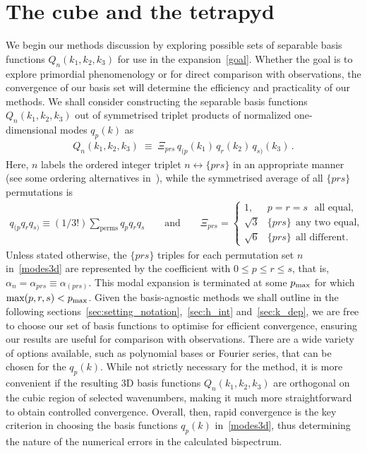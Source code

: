 \section{The cube and the tetrapyd}
We begin our methods discussion by exploring possible sets of separable
basis functions $Q_n(k_1,k_2,k_3)$
for use in the expansion~\eqref{goal}.
Whether the goal is to explore primordial phenomenology or for direct comparison with observations,
the convergence of our basis set will determine the efficiency and practicality
of our methods.
We shall consider constructing the separable basis functions $Q_n(k_1,k_2,k_3)$
out of symmetrised triplet products of normalized one-dimensional modes $q_p(k)$ as
\begin{align}\label{modes3d}
    Q_n(k_1,k_2,k_3) \;\equiv\; {\Xi_{prs} } \, q_{(p} (k_1) \, q_{r}(k_2)\, q_{s)}(k_3)\,.
\end{align}
Here,  $n$ labels the ordered integer triplet $n \leftrightarrow \{p r s\}$ in an appropriate manner (see some ordering alternatives in~\cite{FergShell_3}), while the symmetrised average of all $\{p r s\}$ permutations is 
\begin{align}\label{modes3dsum}
    q_{(p}q_{r}q_{s)}\equiv(1/3!)\sum_\text{perms}q_{p}q_{r}q_{s}\qquad \text{and} \qquad 
     \Xi_{prs}= 
     \begin{cases}
     1, & p = r = s ~~~\text{all equal},\\
     \sqrt{3} & \{p r s\} ~~\text{any two equal,} \\
     \sqrt{6} & \{p r s\}  ~~\text{all  different.}
     \end{cases}
\end{align}
Unless stated otherwise, the $\{prs\}$ triples for each permutation set $n$
in~\eqref{modes3d} are represented by the coefficient with $0\le p\le r\le s$,
that is, $\alpha_n = \alpha_{prs} \equiv \alpha_{(prs)}$.
This modal expansion is terminated at some $p_\text{max}$ for which $\text{max}(p,r,s)<p_\text{max}$. 
Given the basis-agnostic methods we shall outline in the following 
sections~\ref{sec:setting_notation},~\ref{sec:h_int} and~\ref{sec:k_dep},
we are free to choose our set of basis functions to optimise for efficient convergence,
ensuring our results are useful for comparison with observations. 
There are a wide variety of options available, such as polynomial bases
or Fourier series, that can be chosen for the $q_p(k)$.
While not strictly necessary for the method, it is more convenient if 
the resulting 3D basis functions $Q_n(k_1,k_2,k_3)$
are orthogonal on the cubic region of selected wavenumbers, making it much more straightforward to obtain controlled convergence. Overall, then, rapid convergence is the key criterion in choosing the basis functions $q_p(k)$ in~\eqref{modes3d}, thus determining the nature of the numerical errors in the calculated bispectrum.
